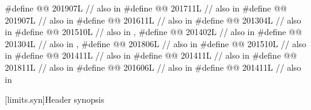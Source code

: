 \begin{codeblock}
#define @@              201907L // also in 
#define @@                        201711L // also in 
#define @@                          201907L // also in 
#define @@                          201611L // also in 
#define @@      201304L // also in 
#define @@             201510L // also in , 
#define @@                   201402L // also in 
#define @@                    201304L // also in , 
#define @@                     201806L // also in 
#define @@     201510L // also in 
#define @@               201411L // also in 
#define @@         201411L // also in 
#define @@                        201811L // also in 
#define @@                           201606L // also in 
#define @@                            201411L // also in 
\end{codeblock}

[limits.syn]{Header  synopsis}

%
%
%
%
%

